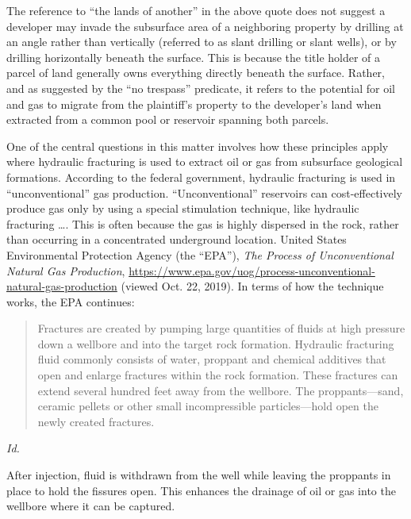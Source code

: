 The reference to ``the lands of another'' in the above quote does not suggest a
developer may invade the subsurface area of a neighboring property by drilling
at an angle rather than vertically (referred to as slant drilling or slant
wells), or by drilling horizontally beneath the surface. This is because the
title holder of a parcel of land generally owns everything directly beneath the
surface. Rather, and as suggested by the ``no trespass'' predicate, it refers to
the potential for oil and gas to migrate from the plaintiff's property to the
developer's land when extracted from a common pool or reservoir spanning both
parcels.


One of the central questions in this matter involves how these principles apply
where hydraulic fracturing is used to extract oil or gas from subsurface
geological formations. According to the federal government, hydraulic fracturing
is used in ``unconventional'' gas production. ``Unconventional'' reservoirs can
cost-effectively produce gas only by using a special stimulation technique, like
hydraulic fracturing \ldots. This is often because the gas is highly dispersed
in the rock, rather than occurring in a concentrated underground location.
United States Environmental Protection Agency (the ``EPA''), \textit{The Process
of Unconventional Natural Gas Production},
\url{https://www.epa.gov/uog/process-unconventional-natural-gas-production}
(viewed Oct. 22, 2019). In terms of how the technique works, the EPA continues:
\begin{quote}
Fractures are created by pumping large quantities of fluids at high pressure
down a wellbore and into the target rock formation. Hydraulic fracturing fluid
commonly consists of water, proppant and chemical additives that open and
enlarge fractures within the rock formation. These fractures can extend several
hundred feet away from the wellbore. The proppants---sand, ceramic pellets or
other small incompressible particles---hold open the newly created fractures.
\end{quote}
\textit{Id.}

After injection, fluid is withdrawn from the well while leaving the proppants in
place to hold the fissures open. This enhances the drainage of oil or gas into
the wellbore where it can be captured.



